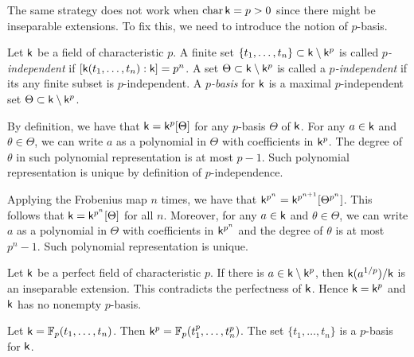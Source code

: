         The same strategy does not work when \(\operatorname{char} {\mathsf{k}} = p > 0\) since there might be inseparable extensions.
        To fix this, we need to introduce the notion of \(p\)-basis.

        \begin{definition}\label{def: p-basis for field of characteristic p}
            Let \({\mathsf{k}}\) be a field of characteristic \(p\).
            A finite set \(\{t_1,\ldots,t_n\} \subset {\mathsf{k}} \setminus {\mathsf{k}}^p\) is called \emph{\(p\)-independent} if \([{\mathsf{k}}(t_1,\ldots,t_n):{\mathsf{k}}]=p^n\).
            A set \(\Theta \subset {\mathsf{k}} \setminus {\mathsf{k}}^p\) is called a \emph{\(p\)-independent} if its any finite subset is \(p\)-independent.
            A \emph{\(p\)-basis} for \({\mathsf{k}}\) is a maximal \(p\)-independent set \(\Theta \subset {\mathsf{k}} \setminus {\mathsf{k}}^p\).
        \end{definition}

        By definition, we have that \({\mathsf{k}} = {\mathsf{k}}^p[\Theta]\) for any \(p\)-basis \(\Theta\) of \({\mathsf{k}}\).
        For any \(a\in {\mathsf{k}}\) and \(\theta \in \Theta\), we can write \(a\) as a polynomial in \(\Theta\) with coefficients in \({\mathsf{k}}^p\).
        The degree of \(\theta\) in such polynomial representation is at most \(p-1\).
        Such polynomial representation is unique by definition of \(p\)-independence.

        Applying the Frobenius map \(n\) times, we have that \({\mathsf{k}}^{p^n} = {\mathsf{k}}^{p^{n+1}}[\Theta^{p^n}]\).
        This follows that \({\mathsf{k}} = {\mathsf{k}}^{p^n}[\Theta]\) for all \(n\).
        Moreover, for any \(a \in {\mathsf{k}}\) and \(\theta \in \Theta\), we can write \(a\) as a polynomial in \(\Theta\) with coefficients in \({\mathsf{k}}^{p^n}\) and the degree of \(\theta\) is at most \(p^n-1\).
        Such polynomial representation is unique.

        Let \({\mathsf{k}}\) be a perfect field of characteristic \(p\).
        If there is \(a \in {\mathsf{k}} \setminus {\mathsf{k}}^p\), then \({\mathsf{k}}(a^{1/p})/{\mathsf{k}}\) is an inseparable extension.
        This contradicts the perfectness of \({\mathsf{k}}\).
        Hence \({\mathsf{k}} = {\mathsf{k}}^p\) and \({\mathsf{k}}\) has no nonempty \(p\)-basis.
            
        \begin{example}\label{eg: p-basis for imperfect fields}
            Let \({\mathsf{k}} = {\mathbb{F}}_p(t_1,\ldots,t_n)\).
            Then \({\mathsf{k}}^p = {\mathbb{F}}_p(t_1^p,\ldots,t_n^p)\).
            The set \(\{t_1,\ldots,t_n\}\) is a \(p\)-basis for \({\mathsf{k}}\).
        \end{example}

